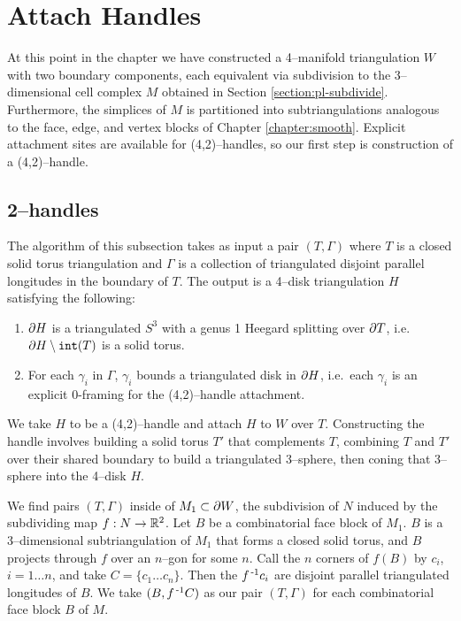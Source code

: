 \section{Attach Handles}
\label{section:pl-handle}

At this point in the chapter we have constructed a 4--manifold triangulation $W$ with two boundary components, each equivalent via subdivision to the 3--dimensional cell complex $M$ obtained in Section \ref{section:pl-subdivide}.
Furthermore, the simplices of $M$ is partitioned into subtriangulations analogous to the face, edge, and vertex blocks of Chapter \ref{chapter:smooth}.
Explicit attachment sites are available for (4,2)--handles, so our first step is construction of a (4,2)--handle.

\subsection{2--handles}
\label{section:pl-2-handle}

The algorithm of this subsection takes as input a pair $(T,\Gamma)$ where $T$ is a closed solid torus triangulation and $\Gamma$ is a collection of triangulated disjoint parallel longitudes in the boundary of $T$.
The output is a 4--disk triangulation $H$ satisfying the following:
\begin{enumerate}
	\item $\partial H$ is a triangulated $S^3$ with a genus 1 Heegard splitting over $\partial T$, i.e.\ $\partial H\setminus \texttt{int}(T)$ is a solid torus.
	\item For each $\gamma_i$ in $\Gamma$, $\gamma_i$ bounds a triangulated disk in $\partial H$, i.e.\ each $\gamma_i$ is an explicit 0-framing for the (4,2)--handle attachment.
\end{enumerate}
We take $H$ to be a (4,2)--handle and attach $H$ to $W$ over $T$.
Constructing the handle involves building a solid torus $T'$ that complements $T$, combining $T$ and $T'$ over their shared boundary to build a triangulated 3--sphere, then coning that 3--sphere into the 4--disk $H$.

We find pairs $(T,\Gamma)$ inside of $M_1\subset\partial W$, the subdivision of $N$ induced by the subdividing map $f:N\to\mathbb{R}^2$.
Let $B$ be a combinatorial face block of $M_1$.
$B$ is a 3--dimensional subtriangulation of $M_1$ that forms a closed solid torus,
and $B$ projects through $f$ over an $n$--gon for some $n$.
Call the $n$ corners of $f(B)$ by $c_i$, $i=1\dots n$, and take $C=\{c_1\dots c_n\}$.
Then the $f^{\,\text{-}1} c_i$ are disjoint parallel triangulated longitudes of $B$.
We take $(B, f^{\,\text{-}1} C)$ as our pair $(T,\Gamma)$ for each combinatorial face block $B$ of $M$.

